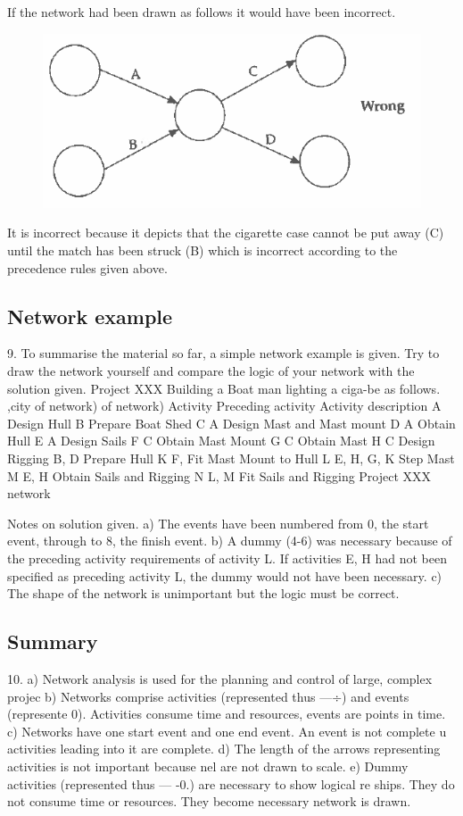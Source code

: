 \documentclass[]{report}
\begin{document}
If the network had been drawn as follows it would have been incorrect. 
\begin{figure}[h!]
\centering
\includegraphics[width=0.4\linewidth]{326-d}
\caption{}
\label{fig:326-d}
\end{figure}


It is incorrect because it depicts that the cigarette case cannot be put away (C) until the 
match has been struck (B) which is incorrect according to the precedence rules given 
above. 
\subsection{Network example }
9. To summarise the material so far, a simple network example is given. Try to draw the 
network yourself and compare the logic of your network with the solution given. 
Project XXX Building a Boat 
man lighting a ciga-be as follows. 
,city 
of network) 
of network) 
Activity Preceding activity Activity description 
A Design Hull 
B Prepare Boat Shed 
C A Design Mast and Mast mount 
D A Obtain Hull 
E A Design Sails 
F C Obtain Mast Mount 
G C Obtain Mast 
H C Design Rigging 
B, D Prepare Hull 
K F, Fit Mast Mount to Hull 
L E, H, G, K Step Mast 
M E, H Obtain Sails and Rigging 
N L, M Fit Sails and Rigging Project XXX network 

Notes on solution given. 
a) The events have been numbered from 0, the start event, through to 8, the finish event. 
b) A dummy (4-6) was necessary because of the preceding activity requirements of 
activity L. If activities E, H had not been specified as preceding activity L, the dummy 
would not have been necessary. 
c) The shape of the network is unimportant but the logic must be correct. 


\subsection*{Summary} 10. a) Network analysis is used for the planning and control of large, complex projec b) Networks comprise activities (represented thus —÷) and events (represente 0). Activities consume time and resources, events are points in time. c) Networks have one start event and one end event. An event is not complete u activities leading into it are complete. d) The length of the arrows representing activities is not important because nel are not drawn to scale. e) Dummy activities (represented thus — -0.) are necessary to show logical re ships. They do not consume time or resources. They become necessary network is drawn. 
\end{document}
